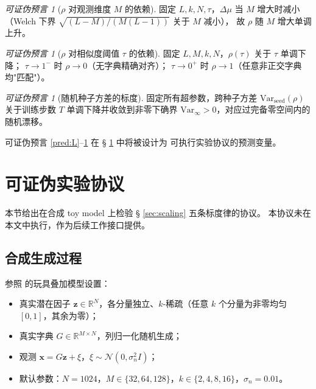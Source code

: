 \documentclass[11pt,a4paper]{article}
\theoremstyle{remark}
\newtheorem{prediction}[theorem]{可证伪预言}
\newcommand{\R}{\mathbb{R}}
\newcommand{\Z}{\bm{z}}
\newcommand{\X}{\bm{x}}
\begin{document}
\begin{prediction}[$\rho$ 对观测维度 $M$ 的依赖]\label{pred:M}
固定 $L, k, N, \tau$，$\Delta\mu$ 当 $M$ 增大时减小（Welch 下界 $\sqrt{(L-M)/(M(L-1))}$ 关于 $M$ 减小），
故 $\rho$ 随 $M$ 增大单调上升。
\end{prediction}

\begin{prediction}[$\rho$ 对相似度阈值 $\tau$ 的依赖]\label{pred:tau}
固定 $L, M, k, N$，$\rho(\tau)$ 关于 $\tau$ 单调下降；
$\tau \to 1^-$ 时 $\rho \to 0$（无字典精确对齐）；
$\tau \to 0^+$ 时 $\rho \to 1$（任意非正交字典均"匹配"）。
\end{prediction}

\begin{prediction}[随机种子方差的标度]\label{pred:seed}
固定所有超参数，跨种子方差 $\mathrm{Var}_{\mathrm{seed}}(\rho)$
关于训练步数 $T$ 单调下降并收敛到非零下确界
$\mathrm{Var}_\infty > 0$，对应过完备零空间内的随机漂移。
\end{prediction}

可证伪预言 \ref{pred:L}–\ref{pred:seed} 在 § \ref{sec:protocol} 中将被设计为
可执行实验协议的预测变量。

\section{可证伪实验协议}\label{sec:protocol}

本节给出在合成 toy model 上检验 § \ref{sec:scaling} 五条标度律的协议。
本协议未在本文中执行，作为后续工作接口提供。

\subsection{合成生成过程}

参照 \cite{elhage2022} 的玩具叠加模型设置：

\begin{itemize}[leftmargin=*,itemsep=2pt]
\item 真实潜在因子 $\Z \in \R^N$，各分量独立、$k$-稀疏（任意 $k$ 个分量为非零均匀 $[0,1]$，其余为零）；
\item 真实字典 $G \in \R^{M \times N}$，列归一化随机生成；
\item 观测 $\X = G \Z + \xi$，$\xi \sim \mathcal{N}(0, \sigma_n^2 I)$；
\item 默认参数：$N = 1024$，$M \in \{32, 64, 128\}$，$k \in \{2, 4, 8, 16\}$，$\sigma_n = 0.01$。
\end{itemize}
\end{document}
